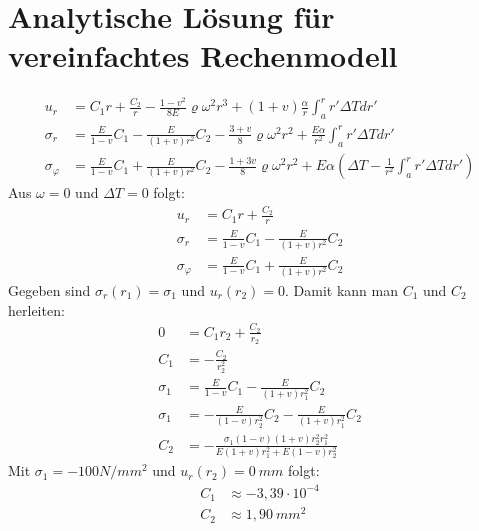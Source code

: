 \documentclass[]{article}
\begin{document}
\begin{center}
\end{center}
\section{Analytische L\"osung f\"ur vereinfachtes Rechenmodell}
\begin{align*}
u_r&=C_1r+\frac{C_2}{r}-\frac{1-v^2}{8E}\varrho\omega^2r^3+(1+v)\frac{\alpha}{r}\int_{a}^{r}r'\Delta Tdr'\\
\sigma_r&=\frac{E}{1-v}C_1-\frac{E}{(1+v)r^2}C_2-\frac{3+v}{8}\varrho\omega^2r^2+\frac{E\alpha}{r^2}\int_{a}^{r}r'\Delta Tdr'\\
\sigma_\varphi&=\frac{E}{1-v}C_1+\frac{E}{(1+v)r^2}C_2-\frac{1+3v}{8}\varrho\omega^2r^2+E\alpha(\Delta T-\frac{1}{r^2}\int_{a}^{r}r'\Delta Tdr')
\end{align*}
Aus $\omega=0$ und $\Delta T=0$ folgt:
\begin{align*}
u_r&=C_1r+\frac{C_2}{r}\\
\sigma_r&=\frac{E}{1-v}C_1-\frac{E}{(1+v)r^2}C_2\\
\sigma_\varphi&=\frac{E}{1-v}C_1+\frac{E}{(1+v)r^2}C_2
\end{align*}
Gegeben sind $\sigma_r(r_1)=\sigma_1$ und $u_r(r_2)=0$. Damit kann man $C_1$ und $C_2$  herleiten:
\begin{align*}
0&=C_1r_2+\frac{C_2}{r_2}\\
C_1&=-\frac{C_2}{r^2_2}\tag{1}\\
\sigma_1&=\frac{E}{1-v}C_1-\frac{E}{(1+v)r^2_1}C_2\\
\sigma_1&=-\frac{E}{(1-v)r^2_2}C_2-\frac{E}{(1+v)r^2_1}C_2\\
C_2&=-\frac{\sigma_1(1-v)(1+v)r^2_2r^2_1}{E(1+v)r^2_1+E(1-v)r^2_2}\tag{2}
\end{align*}
Mit $\sigma_1=-100N/mm^2$ und $u_r(r_2)=0\ mm$ folgt:
\begin{align*}
C_1&\approx -3,39\cdot 10^{-4}\\
C_2&\approx 1,90\ mm^2
\end{align*}
\end{document}
